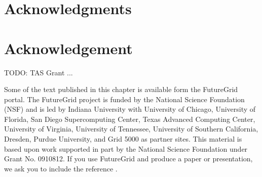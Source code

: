 \documentclass{sig-alternate}
\begin{document}



















\section{Acknowledgments}

\section*{Acknowledgement}

TODO: TAS Grant ... 

Some of the text published in this chapter is available form the
FutureGrid portal. The FutureGrid project is funded by the National
Science Foundation (NSF) and is led by Indiana University with
University of Chicago, University of Florida, San Diego Supercomputing
Center, Texas Advanced Computing Center, University of Virginia,
University of Tennessee, University of Southern California, Dresden,
Purdue University, and Grid 5000 as partner sites. This material is
based upon work supported in part by the National Science Foundation
under Grant No. 0910812. If you use FutureGrid and produce a paper or
presentation, we ask you to include the reference
\cite{las2010gce,las12fg-bookchapter}.



\end{document}
